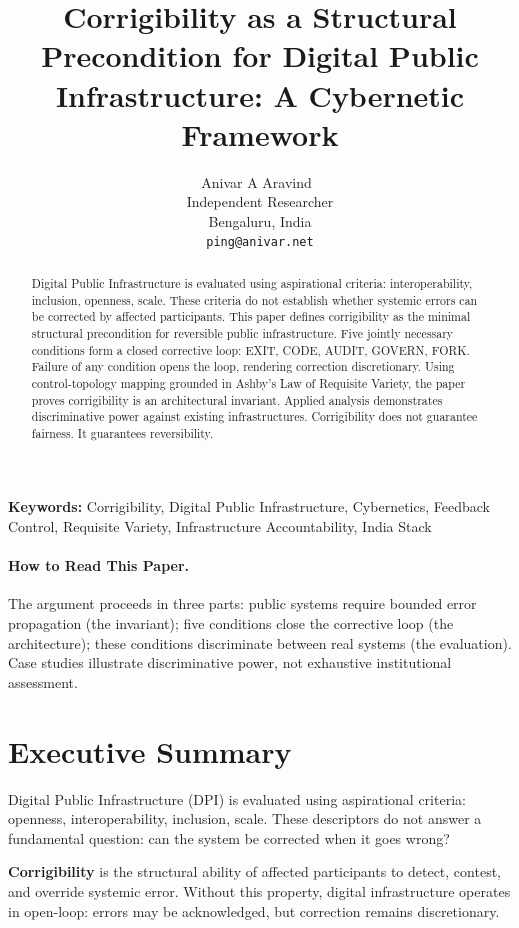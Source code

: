 \documentclass{article}
\title{Corrigibility as a Structural Precondition for Digital Public Infrastructure: A Cybernetic Framework}
\author{
  Anivar A Aravind~\orcidlink{0009-0009-8995-0005} \\
  Independent Researcher\\
  Bengaluru, India \\
  \texttt{ping@anivar.net}
}
\newenvironment{keywords}{\noindent\textbf{Keywords:} }{\par\medskip}
\begin{document}
\maketitle

\begin{abstract}
Digital Public Infrastructure is evaluated using aspirational criteria: interoperability, inclusion, openness, scale. These criteria do not establish whether systemic errors can be corrected by affected participants. This paper defines corrigibility as the minimal structural precondition for reversible public infrastructure. Five jointly necessary conditions form a closed corrective loop: EXIT, CODE, AUDIT, GOVERN, FORK. Failure of any condition opens the loop, rendering correction discretionary. Using control-topology mapping grounded in Ashby's Law of Requisite Variety, the paper proves corrigibility is an architectural invariant. Applied analysis demonstrates discriminative power against existing infrastructures. Corrigibility does not guarantee fairness. It guarantees reversibility.
\end{abstract}

\begin{keywords}
Corrigibility, Digital Public Infrastructure, Cybernetics, Feedback Control, Requisite Variety, Infrastructure Accountability, India Stack
\end{keywords}

\paragraph{How to Read This Paper.}
The argument proceeds in three parts: public systems require bounded error propagation (the invariant); five conditions close the corrective loop (the architecture); these conditions discriminate between real systems (the evaluation). Case studies illustrate discriminative power, not exhaustive institutional assessment.

\section*{Executive Summary}

Digital Public Infrastructure (DPI) is evaluated using aspirational criteria: openness, interoperability, inclusion, scale. These descriptors do not answer a fundamental question: can the system be corrected when it goes wrong?

\textbf{Corrigibility} is the structural ability of affected participants to detect, contest, and override systemic error. Without this property, digital infrastructure operates in open-loop: errors may be acknowledged, but correction remains discretionary.
\end{document}
